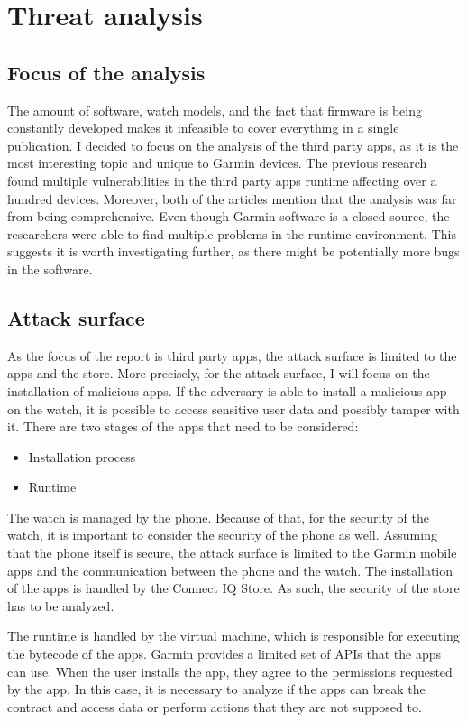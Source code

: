 \chapter{Threat analysis}
\section{Focus of the analysis}
The amount of software, watch models, and the fact that firmware is being constantly developed makes it infeasible to cover everything in a single publication.
I decided to focus on the analysis of the third party apps, as it is the most interesting topic and unique to Garmin devices.
The previous research found multiple vulnerabilities in the third party apps runtime affecting over a hundred devices\cite{broken-vm,compromising-garmin-watches}.
Moreover, both of the articles mention that the analysis was far from being comprehensive.
Even though Garmin software is a closed source, the researchers were able to find multiple problems in the runtime environment.
This suggests it is worth investigating further, as there might be potentially more bugs in the software.

\section{Attack surface}
As the focus of the report is third party apps, the attack surface is limited to the apps and the store.
More precisely, for the attack surface, I will focus on the installation of malicious apps.
If the adversary is able to install a malicious app on the watch, it is possible to access sensitive user data and possibly tamper with it.
There are two stages of the apps that need to be considered:
\begin{itemize}
    \item Installation process
    \item Runtime
\end{itemize}

The watch is managed by the phone.
Because of that, for the security of the watch, it is important to consider the security of the phone as well.
Assuming that the phone itself is secure, the attack surface is limited to the Garmin mobile apps and the communication between the phone and the watch.
The installation of the apps is handled by the Connect IQ Store.
As such, the security of the store has to be analyzed.

The runtime is handled by the virtual machine, which is responsible for executing the bytecode of the apps.
Garmin provides a limited set of APIs that the apps can use.
When the user installs the app, they agree to the permissions requested by the app.
In this case, it is necessary to analyze if the apps can break the contract and access data or perform actions that they are not supposed to.